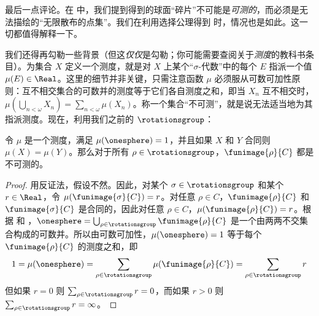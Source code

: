 \documentclass[../../../include/open-logic-section]{subfiles}
\begin{document}
最后一点评论。在  中，我们提到得到的球面“碎片”不可能是\emph{可测的}，而必须是无法描绘的“无限散布的点集”。我们在利用选择公理得到  时，情况也是如此。这一切都值得解释一下。

我们还得再勾勒一些背景（但这\emph{仅仅}是勾勒；你可能需要查阅关于\emph{测度}的教科书条目）。为集合 $X$ 定义一个测度，就是对 $X$ 上某个“$\sigma$-代数”中的每个 $E$ 指派一个值 $\mu(E) \in \Real$。这里的细节并非关键，只需注意函数 $\mu$ 必须服从可数可加性原则：互不相交集合的可数并的测度等于它们各自测度之和，即当 $X_n$ 互不相交时，$\mu(\bigcup_{n < \omega} X_n) = \sum_{n < \omega}\mu(X_n)$。称一个集合“不可测”，就是说无法适当地为其指派测度。现在，利用我们之前的 $\rotationsgroup$：

\begin{cor}[Vitali]
令 $\mu$ 是一个测度，满足 $\mu(\onesphere) = 1$，并且如果 $X$ 和 $Y$ 合同则 $\mu(X) = \mu(Y)$。那么对于所有 $\rho \in \rotationsgroup$，$\funimage{\rho}{C}$ 都是不可测的。
\end{cor}

\begin{proof}
用反证法，假设不然。因此，对某个 $\sigma \in \rotationsgroup$ 和某个 $r \in \Real$，令 $\mu(\funimage{\sigma}{C}) =
r$。对任意 $\rho \in C$，$\funimage{\rho}{C}$ 和 $\funimage{\sigma}{C}$ 是合同的，因此对任意 $\rho \in C$，$\mu(\funimage{\rho}{C}) = r$。根据  和 ，$\onesphere =
\bigcup_{\rho \in \rotationsgroup}\funimage{\rho}{C}$ 是一个由两两不交集合构成的可数并。所以由可数可加性，$\mu(\onesphere) = 1$ 等于每个 $\funimage{\rho}{C}$ 的测度之和，即
\[
	1 = \mu(\onesphere) = \sum_{\rho \in \rotationsgroup}\mu(\funimage{\rho}{C}) = \sum_{\rho \in \rotationsgroup}r
\]
但如果 $r = 0$ 则 $\sum_{\rho \in \rotationsgroup}r = 0$，而如果 $r > 0$ 则 $\sum_{\rho \in \rotationsgroup}r = \infty$。
\end{proof}
\end{document}
